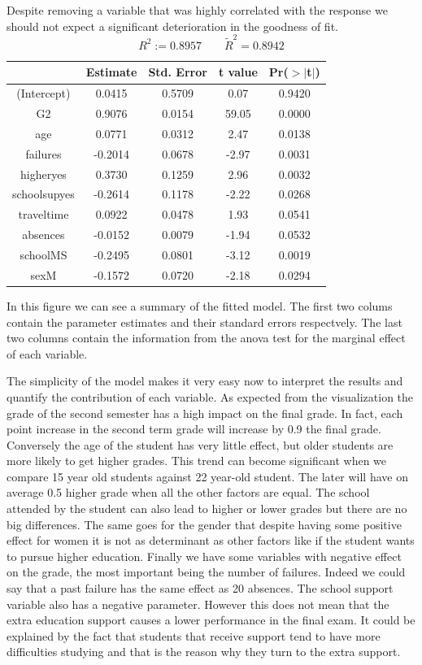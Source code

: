 \documentclass[a4paper, 11pt]{report}
\theoremstyle{definition}
\numberwithin{equation}{section}		%
\numberwithin{figure}{section}			%
\numberwithin{table}{section}				%
\begin{document}
\bigskip
Despite removing a variable that was highly correlated with the response we should not expect a significant deterioration in the goodness of fit.
$$\boxed{R^2 := 0.8957 \quad \quad  \tilde{R}^2 =  0.8942}$$
\bigskip
\begin{table}[ht]
\centering
\begin{tabular}{ccccc}
\hline
  & Estimate & Std. Error & t value & Pr($>$$|$t$|$) \\
  \hline
(Intercept) & 0.0415 & 0.5709 & 0.07 & 0.9420 \\
  G2 & 0.9076 & 0.0154 & 59.05 & 0.0000 \\
  age & 0.0771 & 0.0312 & 2.47 & 0.0138 \\
  failures & -0.2014 & 0.0678 & -2.97 & 0.0031 \\
  higheryes & 0.3730 & 0.1259 & 2.96 & 0.0032 \\
  schoolsupyes & -0.2614 & 0.1178 & -2.22 & 0.0268 \\
  traveltime & 0.0922 & 0.0478 & 1.93 & 0.0541 \\
  absences & -0.0152 & 0.0079 & -1.94 & 0.0532 \\
  schoolMS & -0.2495 & 0.0801 & -3.12 & 0.0019 \\
  sexM & -0.1572 & 0.0720 & -2.18 & 0.0294 \\
   \hline
\end{tabular}
\end{table}

In this figure we can see a summary of the fitted model. The first two colums contain the parameter estimates and their standard errors respectvely. The last two columns contain the information from the anova test for the marginal effect of each variable. \bigskip

The simplicity of the model makes it very easy now to interpret the results and quantify the contribution of each variable. As expected from the visualization the grade of the second semester has a high impact on the final grade. In fact, each point increase in the second term grade will increase by 0.9 the final grade. Conversely the age of the student has very little effect, but older students are more likely to get higher grades. This trend can become significant when we compare 15 year old students against 22 year-old student. The later will have on average 0.5 higher grade when all the other factors are equal. The school attended by the student can also lead to higher or lower grades but there are no big differences. The same goes for the gender that despite having some positive effect for women it is not as determinant as other factors like if the student wants to pursue higher education. Finally we have some variables with negative effect on the grade, the most important being the number of failures. Indeed we could say that a past failure has the same effect as 20 absences. The school support variable also has a negative parameter. However this does not mean that the extra education support causes a lower performance in the final exam. It could be explained by the fact that students that receive support tend to have more difficulties studying and that is the reason why they turn to the extra support.
\end{document}
